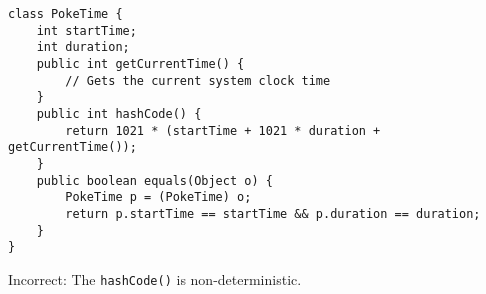\question \begin{lstlisting}
class PokeTime {
    int startTime;
    int duration;
    public int getCurrentTime() {
        // Gets the current system clock time
    }
    public int hashCode() {
        return 1021 * (startTime + 1021 * duration + getCurrentTime());
    }
    public boolean equals(Object o) {
        PokeTime p = (PokeTime) o;
        return p.startTime == startTime && p.duration == duration;
    }
}
\end{lstlisting}

\begin{solution}[1em]
Incorrect: The \lstinline$hashCode()$ is non-deterministic.
\end{solution}

